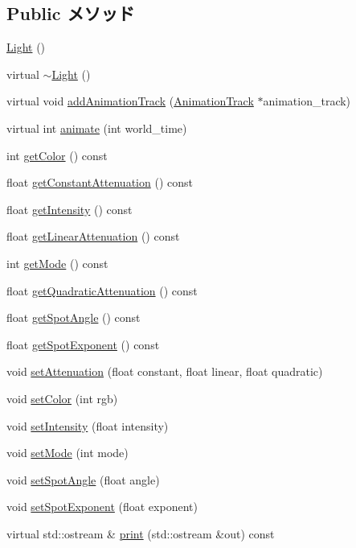 \subsection*{Public メソッド}
\begin{CompactItemize}
\item 
\hyperlink{classm3g_1_1Light_7f8a7be05225f470c200f7e4ff914a3c}{Light} ()
\item 
virtual \hyperlink{classm3g_1_1Light_f50d3d8cdb323e1a9fbd7bfac3aeba06}{$\sim$Light} ()
\item 
virtual void \hyperlink{classm3g_1_1Light_415c0b110f95410ded9b85e5d99a496b}{addAnimationTrack} (\hyperlink{classm3g_1_1AnimationTrack}{AnimationTrack} $\ast$animation\_\-track)
\item 
virtual int \hyperlink{classm3g_1_1Light_8aad1ceab4c2a03609c8a42324ce484d}{animate} (int world\_\-time)
\item 
int \hyperlink{classm3g_1_1Light_4cfa1931c265ec3412fe3f6408a1b4f5}{getColor} () const 
\item 
float \hyperlink{classm3g_1_1Light_9553ab96cb7639acafcebb81888af687}{getConstantAttenuation} () const 
\item 
float \hyperlink{classm3g_1_1Light_ca846da41d09a6ae01d6b362c33e938d}{getIntensity} () const 
\item 
float \hyperlink{classm3g_1_1Light_50e949b0cc2014e576987379cac07769}{getLinearAttenuation} () const 
\item 
int \hyperlink{classm3g_1_1Light_d4ce4524e4751fe5e3cfb8c270347d54}{getMode} () const 
\item 
float \hyperlink{classm3g_1_1Light_9ec7130ca1977cfeb4b2cbebc31971b4}{getQuadraticAttenuation} () const 
\item 
float \hyperlink{classm3g_1_1Light_1117f914d754fe74c090dc97bde905eb}{getSpotAngle} () const 
\item 
float \hyperlink{classm3g_1_1Light_a359fee191741efb7e576616a59a76f7}{getSpotExponent} () const 
\item 
void \hyperlink{classm3g_1_1Light_391c5cff137fc2e810f5129a5381196f}{setAttenuation} (float constant, float linear, float quadratic)
\item 
void \hyperlink{classm3g_1_1Light_b1f5cc0f5cc6bbbd716a526c61f1081d}{setColor} (int rgb)
\item 
void \hyperlink{classm3g_1_1Light_ce02325cb6289c007d569c193641c468}{setIntensity} (float intensity)
\item 
void \hyperlink{classm3g_1_1Light_9f407b18ba6235cb96fa95611c1ea3a4}{setMode} (int mode)
\item 
void \hyperlink{classm3g_1_1Light_30ce206b37f6ed5e918fbc75b3f91072}{setSpotAngle} (float angle)
\item 
void \hyperlink{classm3g_1_1Light_787eb66801e17d0412559598326ce19d}{setSpotExponent} (float exponent)
\item 
virtual std::ostream \& \hyperlink{classm3g_1_1Light_6fea17fa1532df3794f8cb39cb4f911f}{print} (std::ostream \&out) const 
\end{CompactItemize}
